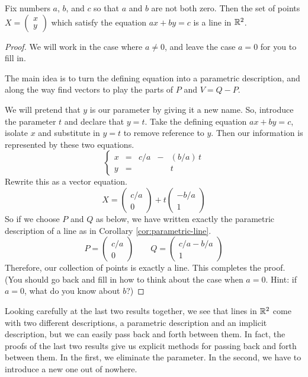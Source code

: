 \documentclass[elementsmain.tex]{subfiles}
\begin{document}
\begin{theorem}\label{thm:param-to-eqn}
Fix numbers $a$, $b$, and $c$ so that $a$ and $b$ are not both zero. Then the set of points $X = \left(\begin{smallmatrix} x \\ y \end{smallmatrix}\right)$ which satisfy the equation $ax+by=c$ is a line in $\mathbb{R}^2$.
\end{theorem}

\begin{proof}
We will work in the case where $a\neq 0$, and leave the case $a=0$ for you to fill in.

The main idea is to turn the defining equation into a parametric description, and along the way find vectors to play the parts of $P$ and $V = Q-P$. 

We will pretend that $y$ is our parameter by giving it a new name. So, introduce the parameter $t$ and declare that $y=t$. Take the defining equation $ax+by=c$, isolate $x$ and substitute in $y=t$ to remove reference to $y$. Then our information is represented by these two equations.
\[
\left\{\begin{array}{rrrrr}
x & = & c/a & - & (b/a)\, t\\
y & = &  &  & t
\end{array}\right.
\]
Rewrite this as a vector equation.
\[
X = \begin{pmatrix} c/a \\ 0 \end{pmatrix} + t \begin{pmatrix} -b/a \\ 1\end{pmatrix}
\]
So if we choose $P$ and $Q$ as below, we have written exactly the parametric description of a line as in Corollary \ref{cor:parametric-line}. 
\[
P = \begin{pmatrix} c/a \\ 0 \end{pmatrix} \qquad Q = \begin{pmatrix} c/a - b/a \\ 1 \end{pmatrix}
\]
Therefore, our collection of points is exactly a line. This completes the proof. (You should go back and fill in how to think about the case when $a=0$. Hint: if $a=0$, what do you know about $b$?)
\end{proof}

Looking carefully at the last two results together, we see that lines in $\mathbb{R}^2$ come with two different descriptions, a parametric description and an implicit description, but we can easily pass back and forth between them. In fact, the proofs of the last two results give us explicit methods for passing back and forth between them. In the first, we eliminate the parameter. In the second, we have to introduce a new one out of nowhere.
\end{document}
